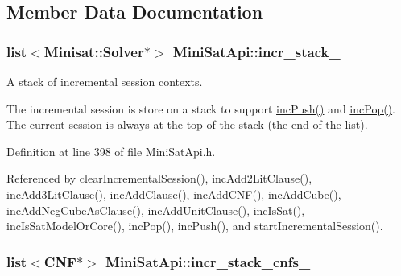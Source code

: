 \subsection{Member Data Documentation}
\hypertarget{classMiniSatApi_ab9dcac91d11eef23cc40d7478464c414}{
\subsubsection[{incr\-\_\-stack\-\_\-}]{\setlength{\rightskip}{0pt plus 5cm}list$<$Minisat\-::\-Solver$\ast$$>$ Mini\-Sat\-Api\-::incr\-\_\-stack\-\_\-\hspace{0.3cm}{\ttfamily [protected]}}}\label{classMiniSatApi_ab9dcac91d11eef23cc40d7478464c414}


A stack of incremental session contexts. 

The incremental session is store on a stack to support \hyperlink{classMiniSatApi_a27013ace25320f68252bef5ba9f2e9ad}{inc\-Push()} and \hyperlink{classMiniSatApi_af388f97db15f77baeb420a8fef74ca6a}{inc\-Pop()}. The current session is always at the top of the stack (the end of the list). 

Definition at line 398 of file Mini\-Sat\-Api.\-h.



Referenced by clear\-Incremental\-Session(), inc\-Add2\-Lit\-Clause(), inc\-Add3\-Lit\-Clause(), inc\-Add\-Clause(), inc\-Add\-C\-N\-F(), inc\-Add\-Cube(), inc\-Add\-Neg\-Cube\-As\-Clause(), inc\-Add\-Unit\-Clause(), inc\-Is\-Sat(), inc\-Is\-Sat\-Model\-Or\-Core(), inc\-Pop(), inc\-Push(), and start\-Incremental\-Session().

\hypertarget{classMiniSatApi_aca2da2d02879e4a05c09124ff84cc4cd}{
\subsubsection[{incr\-\_\-stack\-\_\-cnfs\-\_\-}]{\setlength{\rightskip}{0pt plus 5cm}list$<${\bf C\-N\-F}$\ast$$>$ Mini\-Sat\-Api\-::incr\-\_\-stack\-\_\-cnfs\-\_\-\hspace{0.3cm}{\ttfamily [protected]}}}\label{classMiniSatApi_aca2da2d02879e4a05c09124ff84cc4cd}



